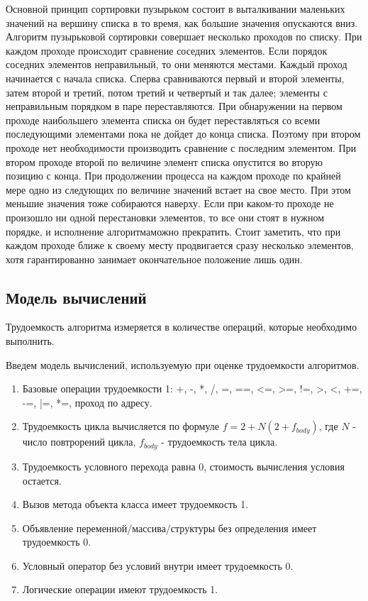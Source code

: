 \documentclass[a4paper,14pt]{report}
\begin{document}
Основной принцип сортировки пузырьком состоит в выталкивании маленьких значений на вершину списка в то время, как большие значения опускаются вниз. Алгоритм пузырьковой сортировки совершает несколько проходов по списку.
При каждом проходе происходит сравнение соседних элементов. Если порядок соседних элементов неправильный, то они меняются местами. Каждый проход начинается с начала списка.
Сперва сравниваются первый и второй элементы, затем второй и третий, потом третий и четвертый и так далее; элементы с неправильным порядком в паре переставляются.
При обнаружении на первом проходе наибольшего элемента списка он будет переставляться со всеми последующими элементами пока не дойдет до конца списка. Поэтому при втором проходе нет необходимости производить сравнение с последним элементом.
При втором проходе второй по величине элемент списка опустится во вторую позицию с конца.
При продолжении процесса на каждом проходе по крайней мере одно из следующих по величине значений встает на свое место.
При этом меньшие значения тоже собираются наверху. Если при каком-то проходе не произошло ни одной перестановки элементов, то все они стоят в нужном порядке, и исполнение алгоритмаможно прекратить.
Стоит заметить, что при каждом проходе ближе к своему месту продвигается сразу несколько элементов, хотя гарантированно занимает окончательное положение лишь один.


\subsection*{Модель вычислений}

Трудоемкость алгоритма измеряется в количестве операций, которые необходимо выполнить.

Введем модель вычислений, используемую при оценке трудоемкости алгоритмов.

\begin{enumerate}
	\item Базовые операции трудоемкости 1: +, -, *, /, =, ==, <=, >=, !=, >, <, +=, -=, |=, *=, проход по адресу.
	\item Трудоемкость цикла вычисляется по формуле $f = 2 + N(2 + f_{body})$, где $N$ - число повтрорений цикла, $f_{body}$ - трудоемкость тела цикла.
	\item Трудоемкость условного перехода равна 0, стоимость вычисления условия остается.
	\item Вызов метода объекта класса имеет трудоемкость 1.
	\item Объявление переменной/массива/структуры без определения имеет трудоемкость 0.\
	\item Условный оператор без условий внутри имеет трудоемкость 0.
	\item Логические операции имеют трудоемкость 1.
\end{enumerate}
\end{document}
